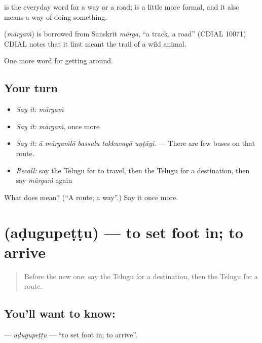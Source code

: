  is the everyday word for a way or a road;  is a little more formal, and it also means a way of doing something.

\begin{cousinweb}
\textbf{} (\emph{mārgaṁ}) is borrowed from Sanskrit \emph{mārga}, \textquotedblleft{}a track, a road\textquotedblright{} (CDIAL 10071). CDIAL notes that it first meant the trail of a wild animal.
\end{cousinweb}

\begin{grammarlens}[title={What you've built}]
One more word for getting around.
\end{grammarlens}

\subsection*{Your turn}
\begin{itemize}
\raggedright
  \item \emph{Say it:} \emph{mārgaṁ}
  \item \emph{Say it:} \emph{mārgaṁ}, once more
  \item \emph{Say it:} \emph{ā mārgaṁlō bassulu takkuvagā uṇṭāyi.} — There are few buses on that route.
  \item \emph{Recall:} say the Telugu for to travel, then the Telugu for a destination, then say \emph{mārgaṁ} again
\end{itemize}

\begin{tcolorbox}[breakable,colback=teal!4,colframe=teal!35!black,title={Before you move on}]
What does  mean? (\textquotedblleft{}A route; a way\textquotedblright{}.) Say it once more.
\end{tcolorbox}
\section[\texorpdfstring{\te{అడుగుపెట్టు} (aḍugupeṭṭu)}{అడుగుపెట్టు (aḍugupeṭṭu)}]{ (aḍugupeṭṭu) — to set foot in; to arrive}

\label{lesson:TE-C438-adugupettu}



\begin{quote}
Before the new one: say the Telugu for a destination, then the Telugu for a route.
\end{quote}

\subsection*{You'll want to know: }
\textbf{} — \emph{aḍugupeṭṭu} — \textquotedblleft{}to set foot in; to arrive\textquotedblright{}.

